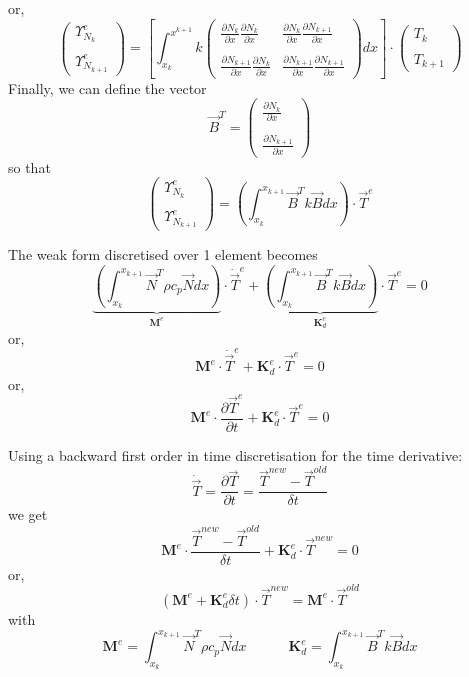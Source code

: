 or,
\[
\left(
\begin{array}{cc}
 {\Upsilon}_{N_k}^e \\ \\ {\Upsilon}_{N_{k+1}}^e
\end{array}
\right)
=
\left[
\int_{x_k}^{x^{k+1}}
k
\left(
\begin{array}{cc}
\frac{\partial N_k}{\partial x}  \frac{\partial  N_{k} } {\partial x}   & 
\frac{\partial N_k}{\partial x}  \frac{\partial  N_{k+1} } {\partial x}  
\\ \\
\frac{\partial N_{k+1}}{\partial x}  \frac{\partial  N_{k} } {\partial x}   & 
\frac{\partial N_{k+1}}{\partial x}  \frac{\partial  N_{k+1} } {\partial x}  
\end{array}
\right)
dx
\right]
\cdot
\left(
\begin{array}{c}
T_k \\ \\ T_{k+1}
\end{array}
\right)
\]
Finally, we can define the vector 
\[
{\vec B}^T=
\left(
\begin{array}{cc}
 \frac{\partial N_k}{\partial x}   \\ \\
 \frac{\partial N_{k+1}}{\partial x}
\end{array}
\right)
\]
so that 
\[
\left(
\begin{array}{cc}
 {\Upsilon}_{N_k}^e \\ \\ {\Upsilon}_{N_{k+1}}^e
\end{array}
\right)
=
\left( \int_{x_k}^{x_{k+1}}   {\vec B}^T k {\vec B} dx  \right) \cdot {\vec T}^e
\]

The weak form discretised over 1 element becomes
\[
\underbrace{\left( \int_{x_k}^{x_{k+1}}   {\vec N}^T \rho c_p {\vec N} dx  \right) }_{\bm M^e} \cdot \dot{\vec T}^e
+
\underbrace{\left( \int_{x_k}^{x_{k+1}}   {\vec B}^T k {\vec B} dx  \right)}_{{\bm K}_d^e} \cdot {\vec T}^e
=0
\]
or,
\[
\boxed{
{\bm M}^e \cdot \dot{\vec T}^e + {\bm K}_d^e \cdot {\vec T}^e = 0
}
\]
or,
\[
\boxed{
{\bm M}^e \cdot \frac{\partial {\vec T}^e}{\partial t} + {\bm K}_d^e \cdot {\vec T}^e = 0
}
\]

Using a backward first order in time discretisation for the time derivative:
\[
\dot{\vec T}= \frac{\partial {\vec T}}{\partial t} = \frac{{\vec T}^{new}-{\vec T}^{old}}{\delta t}
\]
we get
\[
{\bm M}^e \cdot \frac{{\vec T}^{new}-{\vec T}^{old}}{\delta t} + {\bm K}_d^e \cdot {\vec T}^{new} = 0
\]
or, 
\[
\boxed{
( {\bm M}^e +  {\bm K}_d^e  \delta t ) \cdot {\vec T}^{new} =  {\bm M}^e \cdot  {\vec T}^{old}
}
\]
with 
\[
{\bm M}^e=  \int_{x_k}^{x_{k+1}}   {\vec N}^T \rho c_p {\vec N} dx  
\quad\quad\quad
{\bm K}_d^e =
 \int_{x_k}^{x_{k+1}}   {\vec B}^T k {\vec B} dx 
\]

